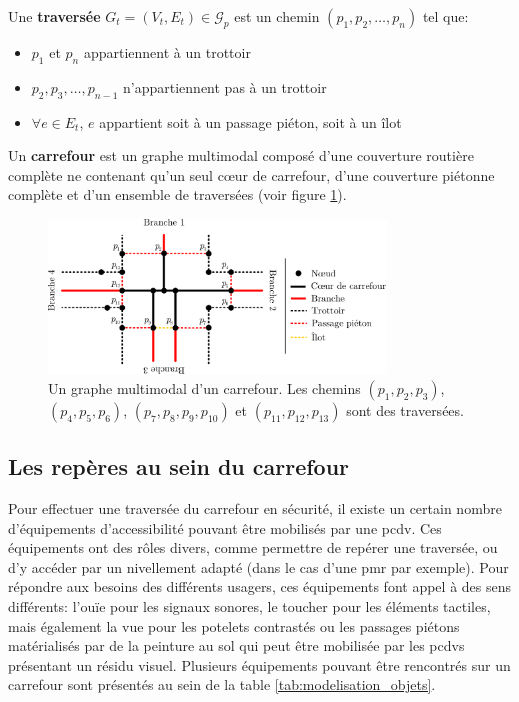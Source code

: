 \begin{definition}
    Une \textbf{traversée} $G_{t} = (V_{t}, E_{t}) \in \mathcal{G}_p$ est un chemin $(p_1, p_2,\dots, p_n)$ tel que:

    \begin{itemize}
        \item $p_1$ et $p_n$ appartiennent à un trottoir
        \item $p_2, p_3, \dots, p_{n-1}$ n'appartiennent pas à un trottoir
        \item $\forall e \in E_t$, $e$ appartient soit à un passage piéton, soit à un îlot
    \end{itemize}
\end{definition}

\begin{definition}
    Un \textbf{carrefour} est un graphe multimodal composé d'une couverture routière complète ne contenant qu'un seul cœur de carrefour, d'une couverture piétonne complète et d'un ensemble de traversées (voir figure \ref{fig:mod_ex_graphe_carrefour}).
\end{definition}

\begin{figure}[ht]
    \centering
    \includegraphics[width=0.8\textwidth]{images/modelisation/graphe/graphe_multimodal.pdf}
    \caption[Graphe multimodal d'un carrefour]{Un graphe multimodal d'un carrefour. Les chemins $(p_1, p_2, p_3)$, $(p_4, p_5, p_6)$, $(p_7, p_8, p_9, p_{10})$ et $(p_{11}, p_{12}, p_{13})$ sont des traversées.}
    \label{fig:mod_ex_graphe_carrefour}
\end{figure}

\subsection{Les repères au sein du carrefour}

\label{sec:mod_repere_carrefour}

Pour effectuer une traversée du carrefour en sécurité, il existe un certain nombre d'équipements d'accessibilité pouvant être mobilisés par une \gls{pcdv}. Ces équipements ont des rôles divers, comme permettre de repérer une traversée, ou d'y accéder par un nivellement adapté (dans le cas d'une \gls{pmr} par exemple). Pour répondre aux besoins des différents usagers, ces équipements font appel à des sens différents: l'ouïe pour les signaux sonores, le toucher pour les éléments tactiles, mais également la vue pour les potelets contrastés ou les passages piétons matérialisés par de la peinture au sol qui peut être mobilisée par les \glspl{pcdv} présentant un résidu visuel. Plusieurs équipements pouvant être rencontrés sur un carrefour sont présentés au sein de la table \ref{tab:modelisation_objets}.

